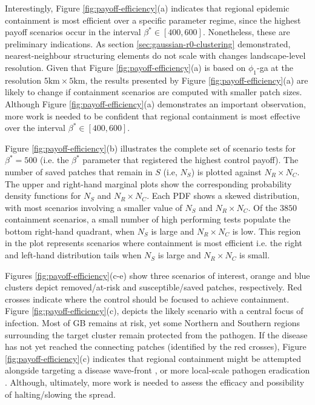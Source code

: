 Interestingly, Figure \ref{fig:payoff-efficiency}(a) indicates that regional epidemic containment is most efficient over a specific parameter regime,
since the highest payoff scenarios occur in the interval $\beta^* \in [400, 600]$.
Nonetheless, these are preliminary indications. 
As section \ref{sec:gaussian-r0-clustering} demonstrated, nearest-neighbour structuring elements do not scale with changes landscape-level resolution.
Given that Figure \ref{fig:payoff-efficiency}(a) is based on $\phi_1$-ga at the resolution $5\mathrm{km} \times 5\mathrm{km}$, the results presented by Figure \ref{fig:payoff-efficiency}(a)
are likely to change if containment scenarios are computed with smaller patch sizes.
Although Figure \ref{fig:payoff-efficiency}(a) demonstrates an important observation, 
more work is needed to be confident that regional containment is most effective over the interval $\beta^* \in [400, 600]$.

Figure \ref{fig:payoff-efficiency}(b) illustrates the complete set of scenario tests for $\beta^*=500$ (i.e. the $\beta^*$ parameter that registered the highest control payoff).
The number of saved patches that remain in $S$ (i.e, $N_S$) is plotted against $N_R \times N_C$.
The upper and right-hand marginal plots show the corresponding probability density functions for $N_S$ and $N_R \times N_C$.
Each PDF shows a skewed distribution, with most scenarios involving a smaller value of $N_S$ and $N_R \times N_C$.
Of the $3850$ containment scenarios, a small number of high performing tests populate the bottom right-hand quadrant, when $N_S$ is large and $N_R \times N_C$ is low.
This region in the plot represents scenarios where containment is most efficient i.e. the right and left-hand distribution tails when $N_S$ is large and $N_R \times N_C$ is small.

Figures \ref{fig:payoff-efficiency}(c-e) show three scenarios of interest, orange and blue clusters depict removed/at-risk and susceptible/saved patches, respectively. 
Red crosses indicate where the control should be focused to achieve containment. 
Figure \ref{fig:payoff-efficiency}(c), depicts the likely scenario with a central focus of infection.
Most of GB remains at risk, yet some Northern and Southern regions surrounding the target cluster remain protected from the pathogen.
If the disease has not yet reached the connecting patches (identified by the red crosses), Figure \ref{fig:payoff-efficiency}(c) indicates that regional containment might be attempted alongside targeting a disease wave-front \cite{large-scale-control}, or more local-scale pathogen eradication \cite{WEBIDEMICS}. 
Although, ultimately, more work is needed to assess the efficacy and possibility of halting/slowing the spread.

